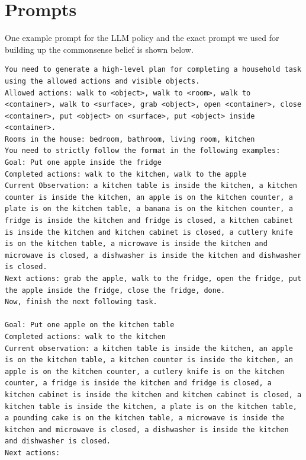 \section{Prompts}
\label{app-sec:prompts}

One example prompt for the LLM policy and the exact prompt we used for building up the commonsense belief is shown below. 

\begin{lstlisting}[caption=Example prompt for the heuristic policy]
You need to generate a high-level plan for completing a household task using the allowed actions and visible objects.
Allowed actions: walk to <object>, walk to <room>, walk to <container>, walk to <surface>, grab <object>, open <container>, close <container>, put <object> on <surface>, put <object> inside <container>.
Rooms in the house: bedroom, bathroom, living room, kitchen
You need to strictly follow the format in the following examples:
Goal: Put one apple inside the fridge
Completed actions: walk to the kitchen, walk to the apple
Current Observation: a kitchen table is inside the kitchen, a kitchen counter is inside the kitchen, an apple is on the kitchen counter, a plate is on the kitchen table, a banana is on the kitchen counter, a fridge is inside the kitchen and fridge is closed, a kitchen cabinet is inside the kitchen and kitchen cabinet is closed, a cutlery knife is on the kitchen table, a microwave is inside the kitchen and microwave is closed, a dishwasher is inside the kitchen and dishwasher is closed.
Next actions: grab the apple, walk to the fridge, open the fridge, put the apple inside the fridge, close the fridge, done.
Now, finish the next following task.

Goal: Put one apple on the kitchen table
Completed actions: walk to the kitchen
Current observation: a kitchen table is inside the kitchen, an apple is on the kitchen table, a kitchen counter is inside the kitchen, an apple is on the kitchen counter, a cutlery knife is on the kitchen counter, a fridge is inside the kitchen and fridge is closed, a kitchen cabinet is inside the kitchen and kitchen cabinet is closed, a kitchen table is inside the kitchen, a plate is on the kitchen table, a pounding cake is on the kitchen table, a microwave is inside the kitchen and microwave is closed, a dishwasher is inside the kitchen and dishwasher is closed.
Next actions:
\end{lstlisting}


